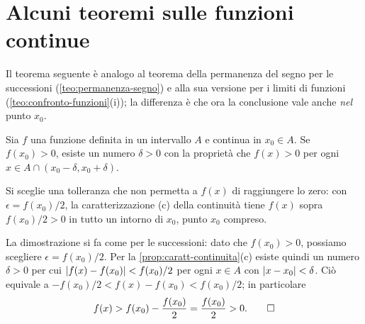 \section{Alcuni teoremi sulle funzioni continue}
\label{sec:teoremi-continue}

Il teorema seguente è analogo al teorema della permanenza del segno per le successioni
(\cref{teo:permanenza-segno}) e alla sua versione per i limiti di funzioni
(\cref{teo:confronto-funzioni}(i)); la differenza è che ora la conclusione vale anche
\emph{nel} punto $x_{0}$.

\begin{teorema}\label{teo:permanenza-segno-continue}
Sia $f$ una funzione definita in un intervallo $A$ e continua in $x_{0}\in A$. Se
$f(x_{0})>0$, esiste un numero $\delta>0$ con la proprietà che $f(x)>0$ per ogni
$x\in A\cap(x_{0}-\delta,x_{0}+\delta)$.
\end{teorema}

\begin{schema}
\end{schema}

\begin{strategia}
Si sceglie una tolleranza che non permetta a $f(x)$ di raggiungere lo zero: con
$\epsilon=f(x_{0})/2$, la caratterizzazione (c) della continuità tiene $f(x)$ sopra
$f(x_{0})/2>0$ in tutto un intorno di $x_{0}$, punto $x_{0}$ compreso.
\end{strategia}

\begin{dimostrazione}
La dimostrazione si fa come per le successioni: dato che $f(x_{0})>0$, possiamo scegliere
$\epsilon=f(x_{0})/2$. Per la \cref{prop:caratt-continuita}(c) esiste quindi un numero
$\delta>0$ per cui $\lvert f(x)-f(x_{0})\rvert<f(x_{0})/2$ per ogni $x\in A$ con
$\lvert x-x_{0}\rvert<\delta$. Ciò equivale a $-f(x_{0})/2<f(x)-f(x_{0})<f(x_{0})/2$; in
particolare
\begin{equation}\label{eq:permanenza-continue}
  f(x)>f(x_{0})-\frac{f(x_{0})}2=\frac{f(x_{0})}2>0 . \qedhere
\end{equation}
\end{dimostrazione}

